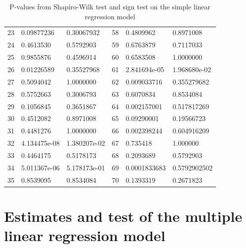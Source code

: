 \begin{table}[H]
\begin{tabular}{c:ll|c:ll}
        23 & 0.09877236 & 0.30067932 & 58 & 0.4809962 &0.8971008\\ 
        24 & 0.4613530 & 0.5792903 & 59 & 0.6763879 &0.7117033 \\ 
        25 & 0.9855876 & 0.4596914 & 60 &  0.6583508 &1.0000000\\ 
        26 & 0.01226589 & 0.35527968 & 61 & 2.841694e-05 &1.968680e-02\\
        27 & 0.5094042 & 1.0000000 & 62 & 0.009033716 &0.355279682\\ 
        28 & 0.5752663 & 0.3006793 & 63 & 0.6070834 &0.8534084\\ 
        29 & 0.1056845 & 0.3651867 & 64 & 0.002157001 &0.517817269\\ 
        30 & 0.4512082 & 0.8971008 & 65 & 0.09290001 &0.19566723\\ 
        31 & 0.4481276 & 1.0000000 & 66 & 0.002398244 &0.604916209\\ 
        32 & 4.134475e-08 & 1.380207e-02 & 67 & 0.735418 &1.000000\\ 
        33 & 0.4464175 & 0.5178173 & 68 & 0.2093689 &0.5792903\\ 
        34 & 5.011367e-06 & 5.178173e-01 & 69 & 0.0001833683 & 0.5792902502 \\ 
        35 & 0.8539095 & 0.8534084 & 70 & 0.1393319 &0.2671823\\
        \hline
    \end{tabular}
    \caption{P-values from Shapiro-Wilk test and sign test on the simple linear regression model}
    \label{tab: shapiro_simple_lm}
\end{table}

\section{Estimates and test of the multiple linear regression model}
